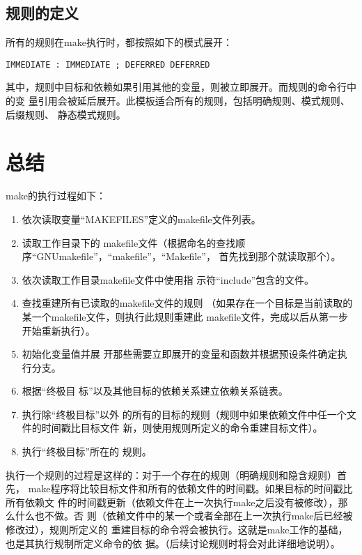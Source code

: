 \subsection{规则的定义}
所有的规则在make执行时，都按照如下的模式展开：
\begin{Verbatim}[]
IMMEDIATE : IMMEDIATE ; DEFERRED DEFERRED
\end{Verbatim}


其中，规则中目标和依赖如果引用其他的变量，则被立即展开。而规则的命令行中的变
量引用会被延后展开。此模板适合所有的规则，包括明确规则、模式规则、后缀规则、
静态模式规则。

\section{总结}
make的执行过程如下：
\begin{enumerate}
\itemsep=0pt \parskip=0pt
\item       依次读取变量“MAKEFILES”定义的makefile文件列表。
\item 读取工作目录下的
    makefile文件（根据命名的查找顺序“GNUmakefile”，“makefile”，“Makefile”，
    首先找到那个就读取那个）。
\item        依次读取工作目录makefile文件中使用指
    示符“include”包含的文件。
    \item       查找重建所有已读取的makefile文件的规则
    （如果存在一个目标是当前读取的某一个makefile文件，则执行此规则重建此
    makefile文件，完成以后从第一步开始重新执行）。
    \item      初始化变量值并展
    开那些需要立即展开的变量和函数并根据预设条件确定执行分支。
    \item 根据“终极目
    标”以及其他目标的依赖关系建立依赖关系链表。
    \item        执行除“终极目标”以外
    的所有的目标的规则（规则中如果依赖文件中任一个文件的时间戳比目标文件
    新，则使用规则所定义的命令重建目标文件）。
    \item      执行“终极目标”所在的
    规则。
\end{enumerate}

执行一个规则的过程是这样的：对于一个存在的规则（明确规则和隐含规则）首先，
make程序将比较目标文件和所有的依赖文件的时间戳。如果目标的时间戳比所有依赖文
件的时间戳更新（依赖文件在上一次执行make之后没有被修改），那么什么也不做。否
则（依赖文件中的某一个或者全部在上一次执行make后已经被修改过），规则所定义的
重建目标的命令将会被执行。这就是make工作的基础，也是其执行规制所定义命令的依
据。（后续讨论规则时将会对此详细地说明）。
